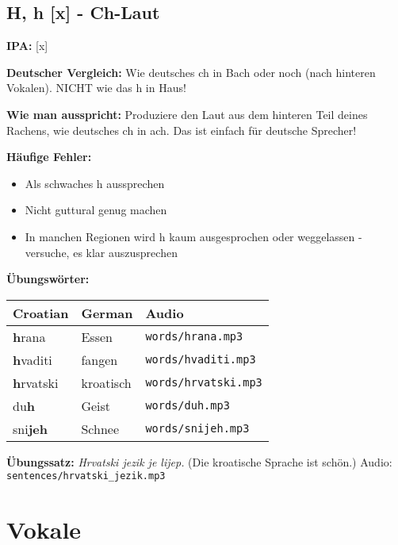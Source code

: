 \subsection{H, h [x] - \glqq Ch-Laut\grqq{}}

\begin{tcolorbox}[colback=lightyellow!30, colframe=orange, title=\textbf{H, h}]

\textbf{IPA:} [x]

\textbf{Deutscher Vergleich:}
Wie deutsches \glqq ch\grqq{} in \glqq Bach\grqq{} oder \glqq noch\grqq{} (nach hinteren Vokalen). NICHT wie das \glqq h\grqq{} in \glqq Haus\grqq{}!

\textbf{Wie man ausspricht:}
Produziere den Laut aus dem hinteren Teil deines Rachens, wie deutsches \glqq ch\grqq{} in \glqq ach\grqq{}. Das ist einfach für deutsche Sprecher!

\textbf{Häufige Fehler:}
\begin{itemize}
    \item Als schwaches \glqq h\grqq{} aussprechen
    \item Nicht guttural genug machen
    \item In manchen Regionen wird \glqq h\grqq{} kaum ausgesprochen oder weggelassen - versuche, es klar auszusprechen
\end{itemize}

\textbf{Übungswörter:}
\begin{tabular}{lll}
\textbf{Croatian} & \textbf{German} & \textbf{Audio} \\
\midrule
\textbf{h}rana & Essen & \texttt{words/hrana.mp3} \\
\textbf{h}vaditi & fangen & \texttt{words/hvaditi.mp3} \\
\textbf{h}rvatski & kroatisch & \texttt{words/hrvatski.mp3} \\
du\textbf{h} & Geist & \texttt{words/duh.mp3} \\
sni\textbf{jeh} & Schnee & \texttt{words/snijeh.mp3} \\
\end{tabular}

\textbf{Übungssatz:}
\textit{Hrvatski jezik je lijep.}
(Die kroatische Sprache ist schön.)
Audio: \texttt{sentences/hrvatski\_jezik.mp3}

\end{tcolorbox}

\section{Vokale}

